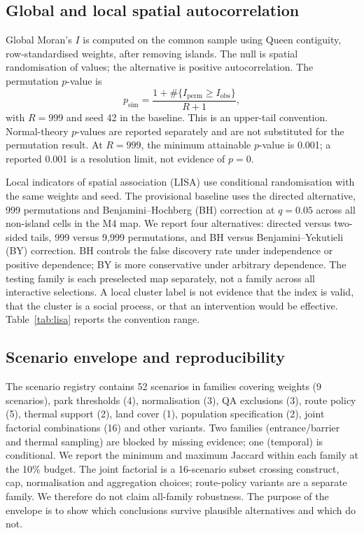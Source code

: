 \documentclass[times,twoside]{_Templates/MultiTargetManuscript}
\begin{document}
\subsection{Global and local spatial autocorrelation}

Global Moran's $I$ is computed on the common sample using Queen contiguity,
row-standardised weights, after removing islands. The null is spatial
randomisation of values; the alternative is positive autocorrelation. The
permutation $p$-value is
\begin{equation}
p_{\mathrm{sim}} = \frac{1 + \#\{I_{\mathrm{perm}} \ge I_{\mathrm{obs}}\}}{R+1},
\label{eq:moranp}
\end{equation}
with $R=999$ and seed 42 in the baseline. This is an upper-tail convention.
Normal-theory $p$-values are reported separately and are not substituted for the
permutation result. At $R=999$, the minimum attainable $p$-value is 0.001; a
reported 0.001 is a resolution limit, not evidence of $p=0$.

Local indicators of spatial association (LISA) use conditional randomisation
with the same weights and seed. The provisional baseline uses the directed
alternative, 999 permutations and Benjamini--Hochberg (BH) correction at
$q=0.05$ across all non-island cells in the M4 map. We report four alternatives:
directed versus two-sided tails, 999 versus 9,999 permutations, and BH versus
Benjamini--Yekutieli (BY) correction. BH controls the false discovery rate under
independence or positive dependence; BY is more conservative under arbitrary
dependence. The testing family is each preselected map separately, not a family
across all interactive selections. A local cluster label is not evidence that
the index is valid, that the cluster is a social process, or that an
intervention would be effective. Table~\ref{tab:lisa} reports the convention
range.

\subsection{Scenario envelope and reproducibility}

The scenario registry contains 52 scenarios in families covering weights
(9 scenarios), park thresholds (4), normalisation (3), QA exclusions (3), route
policy (5), thermal support (2), land cover (1), population specification (2),
joint factorial combinations (16) and other variants. Two families
(entrance/barrier and thermal sampling) are blocked by missing evidence; one
(temporal) is conditional. We report the minimum and maximum Jaccard within each
family at the 10\% budget. The joint factorial is a 16-scenario subset crossing
construct, cap, normalisation and aggregation choices; route-policy variants are
a separate family. We therefore do not claim all-family robustness. The purpose
of the envelope is to show which conclusions survive plausible alternatives and
which do not.
\end{document}
